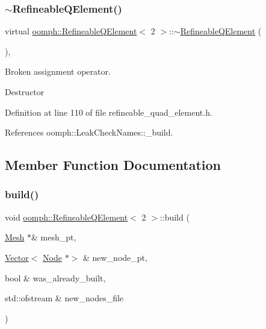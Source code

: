 \subsubsection{\texorpdfstring{$\sim$\+Refineable\+Q\+Element()}{~RefineableQElement()}}
{\footnotesize\ttfamily virtual \hyperlink{classoomph_1_1RefineableQElement}{oomph\+::\+Refineable\+Q\+Element}$<$ 2 $>$\+::$\sim$\hyperlink{classoomph_1_1RefineableQElement}{Refineable\+Q\+Element} (\begin{DoxyParamCaption}{ }\end{DoxyParamCaption})\hspace{0.3cm}{\ttfamily [inline]}, {\ttfamily [virtual]}}



Broken assignment operator. 

Destructor 

Definition at line 110 of file refineable\+\_\+quad\+\_\+element.\+h.



References oomph\+::\+Leak\+Check\+Names\+::\+\_\+build.



\subsection{Member Function Documentation}
\mbox{\label{classoomph_1_1RefineableQElement_3_012_01_4_a8be1a217931d1054ab626ebd1adae182}} 
\subsubsection{\texorpdfstring{build()}{build()}}
{\footnotesize\ttfamily void \hyperlink{classoomph_1_1RefineableQElement}{oomph\+::\+Refineable\+Q\+Element}$<$ 2 $>$\+::build (\begin{DoxyParamCaption}\item[{\hyperlink{classoomph_1_1Mesh}{Mesh} $\ast$\&}]{mesh\+\_\+pt,  }\item[{\hyperlink{classoomph_1_1Vector}{Vector}$<$ \hyperlink{classoomph_1_1Node}{Node} $\ast$$>$ \&}]{new\+\_\+node\+\_\+pt,  }\item[{bool \&}]{was\+\_\+already\+\_\+built,  }\item[{std\+::ofstream \&}]{new\+\_\+nodes\+\_\+file }\end{DoxyParamCaption})\hspace{0.3cm}{\ttfamily [virtual]}}




